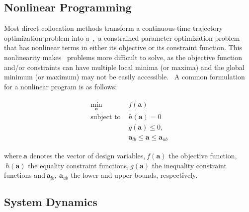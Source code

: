 

        \subsection*{Nonlinear Programming}
        
        Most direct collocation methods transform a continuous-time trajectory optimization problem into a~,~\ie a constrained parameter optimization problem that has nonlinear terms in either its objective or its constraint function. This nonlinearity makes~ problems more difficult to solve, as the objective function and/or constraints can have multiple local minima (or maxima) and the global minimum (or maximum) may not be easily accessible.~\cite{Kelly2017} A common formulation for a nonlinear program is as follows:
        
        \begin{align}
            \begin{array}{ll}
                \min\limits_{\boldsymbol{a}}     & f(\boldsymbol{a}) \\
                \text{subject to }  & h(\boldsymbol{a}) = 0 \\
                                    & g(\boldsymbol{a}) \leq 0, \\
                                    & \boldsymbol{a}_{lb} \leq \boldsymbol{a} \leq \boldsymbol{a}_{ub}
            \end{array}
        \end{align}
        
        where$~\boldsymbol{a}$ denotes the vector of design variables,$~f(\boldsymbol{a})$ the objective function,$~h(\boldsymbol{a})$ the equality constraint functions,$~g(\boldsymbol{a})$ the inequality constraint functions and$~\boldsymbol{a}_{lb},~\boldsymbol{a}_{ub}$ the lower and upper bounds, respectively.
        
        \subsection*{System Dynamics}
        
